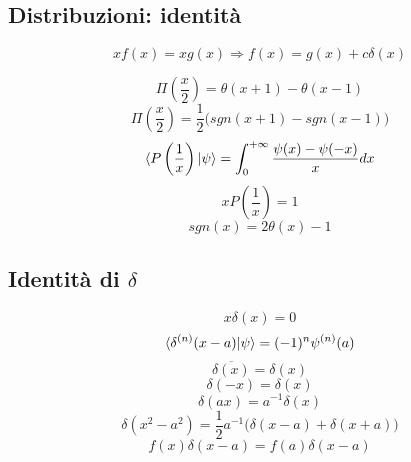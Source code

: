 \documentclass[a4paper, 11pt]{article}
\begin{document}
\vspace{3cm}
\hrulefill
\begin{centering}
\section{Distribuzioni: identità}
\end{centering}

\begin{equation}
    xf(x)=xg(x) \Rightarrow f(x) = g(x) + c \delta (x)  
\end{equation}

\begin{equation}
    \Pi \left( \frac{x}{2} \right) = \theta (x+1) - \theta (x-1)
\end{equation}
\begin{equation}
    \Pi \left( \frac{x}{2} \right) = \frac{1}{2}  \big( sgn(x+1) - sgn(x-1) \big)
\end{equation}
\begin{equation}
    \braket{P \left(\frac{1}{x} \right) | \psi} = \int_0^{+ \infty} \frac{\psi(x)-\psi(-x)}{x}dx
\end{equation}
\begin{equation}
    x P \left( \frac{1}{x} \right) = 1
\end{equation}
\begin{equation}
    sgn(x)= 2 \theta (x) -1
\end{equation}

\newpage
\begin{centering}
\subsection{Identità di $\delta$}
\end{centering}

\begin{equation}
    x \delta (x) =0
\end{equation}
\begin{equation}
    \braket{\delta^{(n)} (x-a) | \psi} = (-1)^n \psi ^{(n)} (a)
\end{equation}
\begin{equation}
    \overline{\delta (x)} = \delta(x)
\end{equation}
\begin{equation}
    \delta(-x) = \delta(x)
\end{equation}
\begin{equation}
    \delta (ax) = a^{-1} \delta(x)
\end{equation}
\begin{equation}
    \delta(x^2 -a^2) = \frac{1}{2} a^{-1} \bigg( \delta(x-a) + \delta (x+a) \bigg)
\end{equation}
\begin{equation}
    f(x) \delta (x-a) = f(a) \delta (x-a)
\end{equation}
\end{document}
